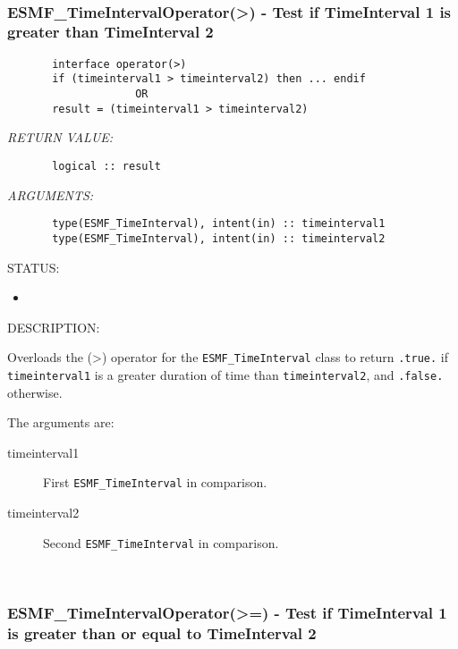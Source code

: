 
\mbox{}\hrulefill\ 
 
\subsubsection [ESMF\_TimeIntervalOperator(>)] {ESMF\_TimeIntervalOperator(>) - Test if TimeInterval 1 is greater than TimeInterval 2}


  
\begin{verbatim}       interface operator(>)
       if (timeinterval1 > timeinterval2) then ... endif
                    OR
       result = (timeinterval1 > timeinterval2)\end{verbatim}{\em RETURN VALUE:}
\begin{verbatim}       logical :: result\end{verbatim}{\em ARGUMENTS:}
\begin{verbatim}       type(ESMF_TimeInterval), intent(in) :: timeinterval1
       type(ESMF_TimeInterval), intent(in) :: timeinterval2\end{verbatim}
{\sf STATUS:}
   \begin{itemize}
   \item{}
   \end{itemize}
  
{\sf DESCRIPTION:\\ }


       Overloads the (>) operator for the {\tt ESMF\_TimeInterval} class to
       return {\tt .true.} if {\tt timeinterval1} is a greater duration of time 
       than {\tt timeinterval2}, and {\tt .false.} otherwise.
  
       The arguments are:
       \begin{description}
       \item[timeinterval1]
            First {\tt ESMF\_TimeInterval} in comparison.
       \item[timeinterval2]
            Second {\tt ESMF\_TimeInterval} in comparison.
       \end{description}
    
 
\mbox{}\hrulefill\ 
 
\subsubsection [ESMF\_TimeIntervalOperator(>=)] {ESMF\_TimeIntervalOperator(>=) - Test if TimeInterval 1 is greater than or equal to TimeInterval 2}


